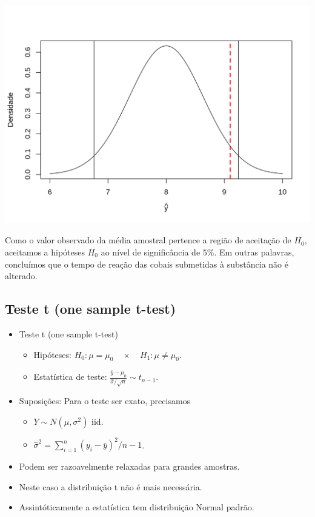 \documentclass[10pt,a4paper]{book}
\providecommand{\tightlist}{%
  \setlength{\itemsep}{0pt}\setlength{\parskip}{0pt}}
\begin{document}
\begin{center}\includegraphics{figures/unnamed-chunk-392-1} \end{center}

Como o valor observado da média amostral pertence a região de aceitação
de \(H_0\), aceitamos a hipóteses \(H_0\) ao nível de significância de
\(5\%\). Em outras palavras, concluímos que o tempo de reação das cobais
submetidas à substância não é alterado.

\subsection{Teste t (one sample
t-test)}\label{teste-t-one-sample-t-test}

\begin{itemize}
\tightlist
\item
  Teste t (one sample t-test)

  \begin{itemize}
  \tightlist
  \item
    Hipóteses:
    \(H_0: \mu = \mu_0 \quad \times \quad H_1: \mu \neq \mu_0.\)
  \item
    Estatística de teste:
    \(\frac{\bar{y} - \mu_0}{\hat{\sigma}/\sqrt{n}} \sim t_{n-1}.\)
  \end{itemize}
\item
  Suposições: Para o teste ser exato, precisamos

  \begin{itemize}
  \tightlist
  \item
    \(Y \sim N(\mu, \sigma^2)\) iid.
  \item
    \(\hat{\sigma}^2 = \sum_{i=1}^n (y_i - \bar{y})^2/n-1\).
  \end{itemize}
\item
  Podem ser razoavelmente relaxadas para grandes amostras.
\item
  Neste caso a distribuição t não é mais necessária.
\item
  Assintóticamente a estatística tem distribuição Normal padrão.
\end{itemize}
\end{document}
